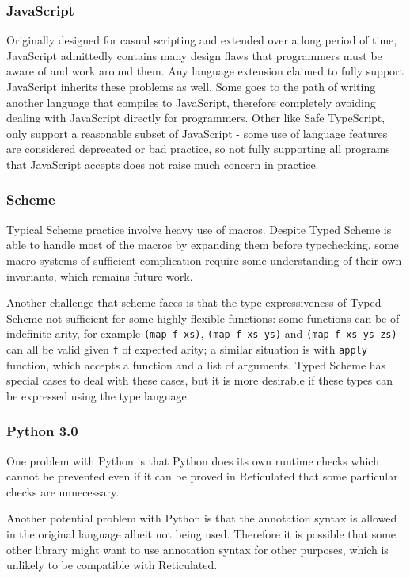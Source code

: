 \subsubsection{JavaScript}

Originally designed for casual scripting and extended over a long period of time,
JavaScript admittedly contains many design flaws that
programmers must be aware of and work around them.
Any language extension claimed to fully support JavaScript inherits these problems as well.
Some goes to the path of writing another language that compiles to JavaScript,
therefore completely avoiding dealing with JavaScript directly for programmers.
Other like Safe TypeScript, only support a reasonable subset of JavaScript -
some use of language features are considered deprecated or bad practice,
so not fully supporting all programs that JavaScript accepts does not raise
much concern in practice.

\subsubsection{Scheme}

Typical Scheme practice involve heavy use of macros.
Despite Typed Scheme is able to handle most of the macros by expanding them before typechecking,
some macro systems of sufficient complication require some understanding of their own invariants,
which remains future work.

Another challenge that scheme faces is that the type expressiveness of Typed Scheme
not sufficient for some highly flexible functions:
some functions can be of indefinite arity, for example \texttt{(map f xs)}, \texttt{(map f xs ys)}
and \texttt{(map f xs ys zs)} can all be valid given \texttt{f} of expected arity;
a similar situation is with \texttt{apply} function, which accepts a function and a list of arguments.
Typed Scheme has special cases to deal with these cases, but it is more desirable
if these types can be expressed using the type language.

\subsubsection{Python 3.0}

One problem with Python is that Python does its own runtime checks which cannot be prevented
even if it can be proved in Reticulated that some particular checks are unnecessary.

Another potential problem with Python is that the annotation syntax is allowed
in the original language albeit not being used.
Therefore it is possible that some other library might want to use annotation syntax for other purposes, which is unlikely to be compatible with Reticulated.

